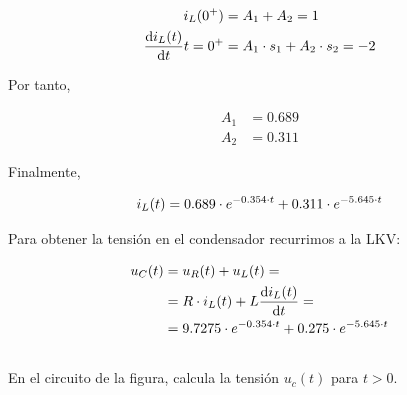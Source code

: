 \documentclass[12pt]{article}
\begin{document}
\begin{align*}
  i_L(0^+) &= A_1 + A_2 = 1\\
  \diff{i_L(t)}{t}{t = 0^+} &= A_1 \cdot s_1 + A_2 \cdot s_2 = -2
\end{align*}

Por tanto,

\begin{align*}
  A_1 &= 0.689\\
  A_2 &= 0.311
\end{align*}

Finalmente,

\begin{equation*}
  i_L(t) = 0.689 \cdot e^{-0.354 \cdot t} + 0.311 \cdot e^{-5.645 \cdot t}\\
\end{equation*}

Para obtener la tensión en el condensador recurrimos a la LKV:

\begin{align*}
  u_C(t) &= u_R(t) + u_L(t) = \\
         &= R \cdot i_L(t) + L \diff{i_L(t)}{t} = \\
  &= 9.7275 \cdot e^{-0.354 \cdot t} + 0.275 \cdot e^{-5.645 \cdot t}
\end{align*}

\clearpage

\subsection{}

En el circuito de la figura, calcula la tensión $u_c(t)$ para $t > 0$.

\vspace*{1cm}
\end{document}
